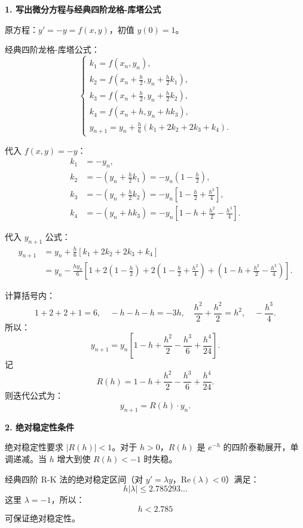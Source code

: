 \documentclass[lang=cn,newtx,12pt,scheme=chinese]{elegantbook}
\begin{document}
\begin{solution}
	\noindent\textbf{1. 写出微分方程与经典四阶龙格-库塔公式}
	
	原方程：$y' = -y = f(x, y)$，初值 $y(0) = 1$。
	
	经典四阶龙格-库塔公式：
	\[
	\begin{cases}
		k_1 = f(x_n, y_n), \\
		k_2 = f\left(x_n + \frac{h}{2}, y_n + \frac{h}{2}k_1\right), \\
		k_3 = f\left(x_n + \frac{h}{2}, y_n + \frac{h}{2}k_2\right), \\
		k_4 = f\left(x_n + h, y_n + h k_3\right), \\
		y_{n+1} = y_n + \frac{h}{6}(k_1 + 2k_2 + 2k_3 + k_4).
	\end{cases}
	\]
	
	代入 $f(x, y) = -y$：
	\[
	\begin{aligned}
		k_1 &= -y_n, \\
		k_2 &= -\left(y_n + \frac{h}{2}k_1\right) = -y_n\left(1 - \frac{h}{2}\right), \\
		k_3 &= -\left(y_n + \frac{h}{2}k_2\right) = -y_n\left[1 - \frac{h}{2} + \frac{h^2}{4}\right], \\
		k_4 &= -\left(y_n + h k_3\right) = -y_n\left[1 - h + \frac{h^2}{2} - \frac{h^3}{4}\right].
	\end{aligned}
	\]
	
	代入 $y_{n+1}$ 公式：
	\[
	\begin{aligned}
		y_{n+1} &= y_n + \frac{h}{6}\left[k_1 + 2k_2 + 2k_3 + k_4\right] \\
		&= y_n - \frac{h y_n}{6}\left[1 + 2\left(1 - \frac{h}{2}\right) + 2\left(1 - \frac{h}{2} + \frac{h^2}{4}\right) + \left(1 - h + \frac{h^2}{2} - \frac{h^3}{4}\right)\right].
	\end{aligned}
	\]
	
	计算括号内：
	\[
	1 + 2 + 2 + 1 = 6, \quad
	- h - h - h = -3h, \quad
	\frac{h^2}{2} + \frac{h^2}{2} = h^2, \quad
	- \frac{h^3}{4}.
	\]
	所以：
	\[
	y_{n+1} = y_n\left[1 - h + \frac{h^2}{2} - \frac{h^3}{6} + \frac{h^4}{24}\right].
	\]
	记
	\[
	R(h) = 1 - h + \frac{h^2}{2} - \frac{h^3}{6} + \frac{h^4}{24}.
	\]
	则迭代公式为：
	\[
	y_{n+1} = R(h) \cdot y_n.
	\]
	
	\noindent\textbf{2. 绝对稳定性条件}
	
	绝对稳定性要求 $|R(h)| < 1$。对于 $h > 0$，$R(h)$ 是 $e^{-h}$ 的四阶泰勒展开，单调递减。当 $h$ 增大到使 $R(h) < -1$ 时失稳。
	
	经典四阶 R-K 法的绝对稳定区间（对 $y' = \lambda y$，$\mathrm{Re}(\lambda) < 0$）满足：
	\[
	h|\lambda| \le 2.785293\ldots
	\]
	这里 $\lambda = -1$，所以：
	\[
	h < 2.785
	\]
	可保证绝对稳定性。
	

\end{solution}
\end{document}
